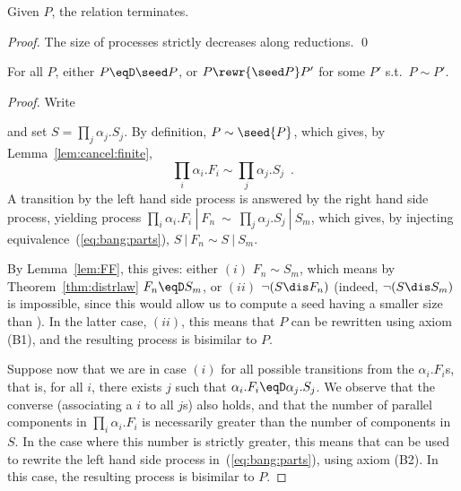\documentclass{llncs}
\begin{document}
\begin{lem}\label{lem:rewr:sn}
  Given $P$, the relation  terminates.
\end{lem}
\begin{proof}
  The size of processes strictly decreases along reductions.  \qed
\end{proof}

\begin{lem}\label{lem:eqD:rewr}
  For all $P$, either $P\eqD\seed P$, or $P\rewr{\seed P}P'$ for some
  $P'$ s.t.\ $P\sim P'$.
\end{lem}
\begin{proof}
  Write
\noindent and set $S = \prod_j \!\alpha_j.S_j$.
By definition, $P\sim \seed{P}$, which gives, by
Lemma~\ref{lem:cancel:finite}, 
\begin{equation}
\prod_i \!\alpha_i.F_i\sim \prod_j \!\alpha_j.S_j
\enspace.
\label{eq:bang:parts}
\end{equation}
A transition by the left hand side process is answered by the right
hand side process, yielding process
$\prod_i \!\alpha_i.F_i~|~ F_n~\sim~ \!\prod_j \!\alpha_j.S_j~|~ S_m$,
which 
gives, by injecting equivalence~(\ref{eq:bang:parts}), 
$S~|~ F_n\sim S~|~ S_m$.

By Lemma~\ref{lem:FF}, this gives: either $(i)$ $F_n\sim S_m$, which
means by Theorem~\ref{thm:distrlaw} $F_n\eqD S_m$, or $(ii)$
$\neg(S\dis F_n)$ (indeed, $\neg(S\dis S_m)$ is impossible, since this
would allow us to compute a seed having a smaller size than
). In the latter case, $(ii)$, this means that $P$ can be
rewritten using axiom (B1), and the resulting process is bisimilar to
$P$.

Suppose now that we are in case $(i)$ for all possible transitions
from the $\alpha_i.F_i$s, that is, for all $i$, there exists $j$ such that
$\alpha_i.F_i\eqD \alpha_j.S_j$. We observe that the converse (associating a
$i$ to all $j$s) also holds, and that the number of parallel
components in $\prod_i \!\alpha_i.F_i$ is necessarily greater than the
number of components in $S$. In the case where this number is strictly
greater, this means that  can be used to rewrite the
left hand side process in~(\ref{eq:bang:parts}), using axiom (B2). In
this case, the resulting process is bisimilar to $P$.


\end{proof}
\end{document}
